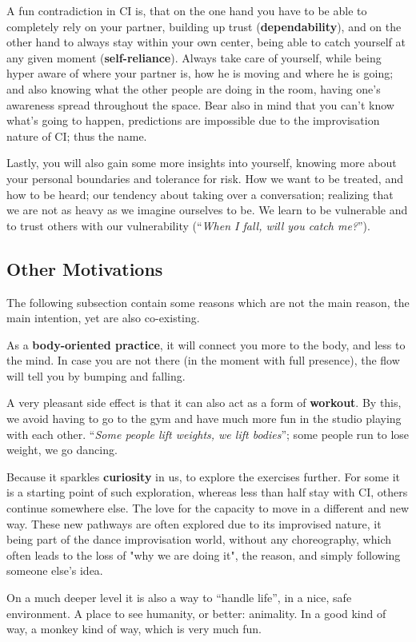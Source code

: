 A fun contradiction in CI is, that on the one hand you have to be able to completely rely on your partner, building up trust (\textbf{dependability}), and on the other hand to always stay within your own center, being able to catch yourself at any given moment (\textbf{self-reliance}).
Always take care of yourself, while being hyper aware of where your partner is, how he is moving and where he is going;
and also knowing what the other people are doing in the room, having one's awareness spread throughout the space.
Bear also in mind that you can't know what's going to happen, predictions are impossible due to the improvisation nature of CI; thus the name.

Lastly, you will also gain some more insights into yourself, knowing more about your personal boundaries and tolerance for risk.
How we want to be treated, and how to be heard;
our tendency about taking over a conversation; realizing that we are not as heavy as we imagine ourselves to be.
We learn to be vulnerable and to trust others with our vulnerability (``\textit{When I fall, will you catch me?}'').

\subsection{Other Motivations}\label{subsec:other-motivations}

The following subsection contain some reasons which are not the main reason, the main intention, yet are also co-existing.

As a \textbf{body-oriented practice}, it will connect you more to the body, and less to the mind.
In case you are not there (in the moment with full presence), the flow will tell you by bumping and falling.

A very pleasant side effect is that it can also act as a form of \textbf{workout}.
By this, we avoid having to go to the gym and have much more fun in the studio playing with each other.
``\textit{Some people lift weights, we lift bodies}'';
some people run to lose weight, we go dancing.

Because it sparkles \textbf{curiosity} in us, to explore the exercises further.
For some it is a starting point of such exploration, whereas less than half stay with CI, others continue somewhere else.
The love for the capacity to move in a different and new way.
These new pathways are often explored due to its improvised nature, it being part of the dance improvisation world, without any choreography, which often leads to the loss of "why we are doing it", the reason, and simply following someone else's idea.

On a much deeper level it is also a way to ``handle life'', in a nice, safe environment.
A place to see humanity, or better: animality.
In a good kind of way, a monkey kind of way, which is very much fun.
